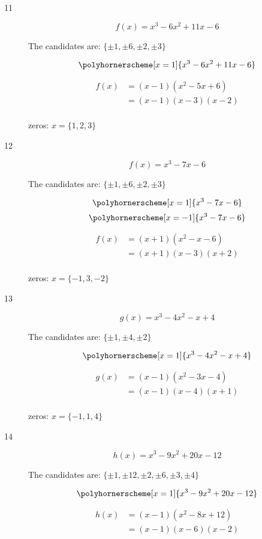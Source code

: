 \documentclass[fleqn,addpoints]{exam}
\begin{document}
\begin{description}
\item[11]
\[ 
  f(x) = x^3-6x^2+11x-6
\]

The candidates are: $\{\pm1, \pm6, \pm2, \pm 3 \}$

\[ 
  \polyhornerscheme[x=1]{x^3-6x^2+11x-6} \\
\]

\begin{align*}
  f(x) &= (x-1)(x^2-5x+6) \\
  &= (x-1)(x-3)(x-2) \\
\end{align*}

zeros: $x = \{ 1, 2, 3 \}$

\item[12]
\[ 
  f(x) = x^3-7x-6 
\]

The candidates are: $\{\pm 1, \pm 6, \pm 2, \pm 3 \}$

\[
  \polyhornerscheme[x=1]{x^3-7x-6} 
\]
\[
  \polyhornerscheme[x=-1]{x^3-7x-6} 
\]


\begin{align*}
  f(x) &=  (x+1)(x^2-x-6)\\
  &=  (x+1)(x-3)(x+2) \\
\end{align*}

zeros: $x = \{ -1, 3, -2 \}$

\item[13]
\[ 
  g(x) = x^3 - 4x^2 - x + 4
\]

The candidates are: $\{\pm 1, \pm 4, \pm 2\}$

\[ 
  \polyhornerscheme[x=1]{x^3 - 4x^2 - x + 4}
\]

\begin{align*}
  g(x) &=  (x-1)(x^2 - 3x - 4) \\
  &=  (x-1)(x-4)(x+1) \\
\end{align*}

zeros: $x = \{ -1, 1, 4 \}$

\item[14]
\[ 
  h(x) = x^3-9x^2+20x-12
\]

The candidates are: $\{\pm 1, \pm 12, \pm 2, \pm 6, \pm 3, \pm 4\}$

\[ 
  \polyhornerscheme[x=1]{x^3-9x^2+20x-12}
\]

\begin{align*}
  h(x) &=  (x-1)(x^2-8x+12) \\
  &=  (x-1)(x-6)(x-2) \\
\end{align*}


\end{description}
\end{document}
